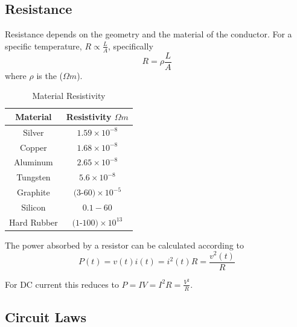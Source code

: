 \documentclass[12pt, a4paper, oneside, openright, titlepage]{book}
\begin{document}
\subsection{Resistance}

Resistance depends on the geometry and the material of the conductor. For a specific temperature, $R \propto \frac{L}{A}$, specifically \begin{equation*}
    R = \rho\frac{L}{A}
\end{equation*}
where $\rho$ is the  ($\Omega m$).

\begin{table}[H]
    \centering
    \caption{Material Resistivity}
    \begin{tabular}{|cc|}
        \hline 
        Material & Resistivity $\Omega m$ \\ \hline
        Silver & $1.59\times 10^{-8}$ \\ \hline
        Copper & $ 1.68\times 10^{-8}$ \\ \hline 
        Aluminum & $2.65\times 10^{-8}$ \\ \hline
        Tungsten & $5.6\times 10^{-8}$ \\ \hline
        Graphite & $(3$-$60)\times 10^{-5}$ \\\hline
        Silicon & $0.1-60$ \\ \hline
        Hard Rubber & $(1$-$100)\times 10^{13}$ \\ \hline
    \end{tabular}
\end{table}

\begin{defn}
    The power absorbed by a resistor can be calculated according to \begin{equation*}
        P(t) = v(t)i(t) = i^2(t)R = \frac{v^2(t)}{R}
    \end{equation*}
\end{defn}
For DC current this reduces to $P = IV = I^2R = \frac{V^2}{R}$.

\subsection{Circuit Laws}
\end{document}
